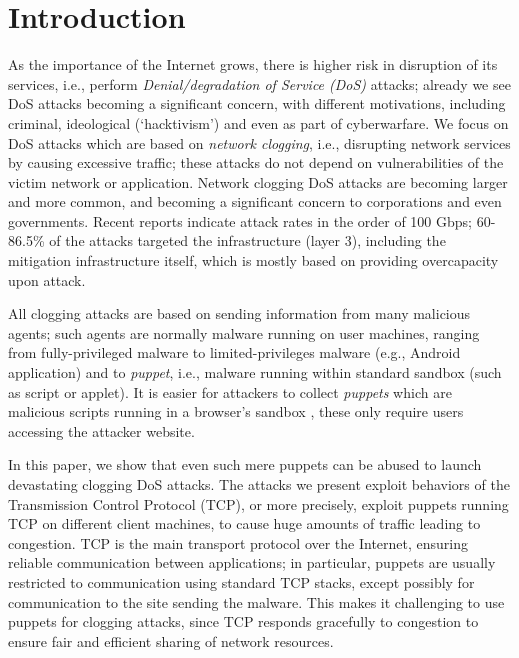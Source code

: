 \documentclass[conference]{IEEEtran}
\begin{document}
\section{Introduction} \label{intro}


As the importance of the Internet grows, there is higher risk in disruption of its services, i.e., perform {\em Denial/degradation of Service (DoS)} attacks; already we see DoS attacks becoming a significant concern, with different motivations, including criminal, ideological (`hacktivism') and even as part of cyberwarfare.
We focus on DoS attacks which are based on {\em network clogging}, i.e., disrupting network services by causing excessive traffic; these attacks do not depend on vulnerabilities of the victim network or application. Network clogging DoS attacks are becoming larger and more common, and becoming a significant concern to corporations and even governments. Recent reports indicate attack rates in the order of 100 Gbps\cite{arbor:reports}; 60-86.5\% of the attacks targeted the infrastructure (layer 3), including the mitigation infrastructure itself\cite{survey:ProlexicReport11}, which is mostly based on providing overcapacity upon attack. 

All clogging attacks are based on sending information from many malicious agents; such agents are normally malware running on user machines, ranging from fully-privileged malware to limited-privileges malware (e.g., Android application) and to {\em puppet}, i.e., malware running within standard sandbox (such as script or applet). It is easier for attackers to collect {\em puppets} which are malicious scripts running in a browser's sandbox \cite{AATA08:puppetnets}, these only require users accessing the attacker website. 

In this paper, we show that even such mere puppets can be abused to launch devastating clogging DoS attacks. The attacks we present exploit behaviors of the Transmission Control Protocol (TCP), or more precisely, exploit puppets running TCP on different client machines, to cause huge amounts of traffic leading to congestion. TCP is the main transport protocol over the Internet, ensuring reliable communication between applications;
in particular, puppets are usually restricted to communication using standard TCP stacks, except possibly for communication to the site sending the malware. This makes it challenging to use puppets for clogging attacks, since TCP responds gracefully to congestion to ensure fair and efficient sharing of network resources. 
\end{document}
